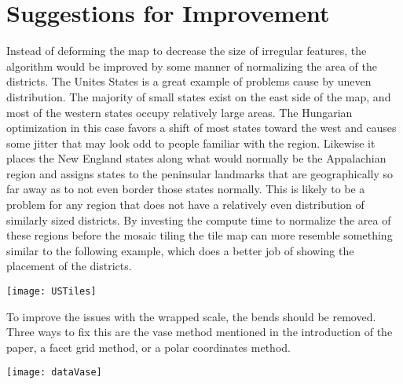 \documentclass[a4paper,man,natbib]{apa6}
\begin{document}
	\section{Suggestions for Improvement}
	
	Instead of deforming the map to decrease the size of irregular features, the algorithm would be improved by some manner of normalizing the area of the districts. The Unites States is a great example of problems cause by uneven distribution. The majority of small states exist on the east side of the map, and most of the western states occupy relatively large areas. The Hungarian optimization in this case favors a shift of most states toward the west and causes some jitter that may look odd to people familiar with the region. Likewise it places the New England states along what would normally be the Appalachian region and assigns states to the peninsular landmarks that are geographically so far away as to not even border those states normally. This is likely to be a problem for any region that does not have a relatively even distribution of similarly sized districts. By investing the compute time  to normalize the area of these regions before the mosaic tiling the tile map can more resemble something similar to the following example, which does a better job of showing the placement of the districts. \vspace{1em}
	
	\begin{minipage}{\linewidth}
		\begin{center}
			\texttt{[image: USTiles]}
		\end{center}
	\end{minipage}\vspace{2em} 

	To improve the issues with the wrapped scale, the bends should be removed. Three ways to fix this are the vase method mentioned in the introduction of the paper, a facet grid method, or a polar coordinates method. \\

	\begin{minipage}{\linewidth}
		\begin{center}
			\texttt{[image: dataVase]}
		\end{center}
	\end{minipage}\vspace{2em} 
\end{document}
